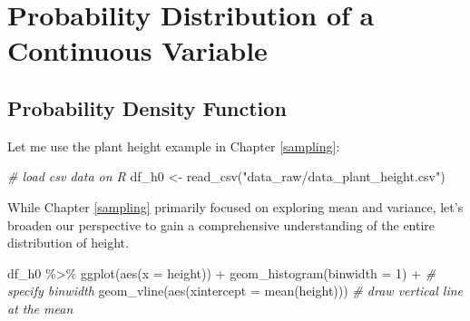 \documentclass[
]{book}
\newenvironment{Shaded}{\begin{snugshade}}{\end{snugshade}}
\newcommand{\AttributeTok}[1]{\textcolor[rgb]{0.77,0.63,0.00}{#1}}
\newcommand{\CommentTok}[1]{\textcolor[rgb]{0.56,0.35,0.01}{\textit{#1}}}
\newcommand{\DecValTok}[1]{\textcolor[rgb]{0.00,0.00,0.81}{#1}}
\newcommand{\FunctionTok}[1]{\textcolor[rgb]{0.00,0.00,0.00}{#1}}
\newcommand{\NormalTok}[1]{#1}
\newcommand{\OtherTok}[1]{\textcolor[rgb]{0.56,0.35,0.01}{#1}}
\newcommand{\SpecialCharTok}[1]{\textcolor[rgb]{0.00,0.00,0.00}{#1}}
\newcommand{\StringTok}[1]{\textcolor[rgb]{0.31,0.60,0.02}{#1}}
\begin{document}
\hypertarget{probability-distribution-of-a-continuous-variable}{%
\section{Probability Distribution of a Continuous Variable}\label{probability-distribution-of-a-continuous-variable}}

\hypertarget{probability-density-function}{%
\subsection{Probability Density Function}\label{probability-density-function}}

Let me use the plant height example in Chapter \ref{sampling}:

\begin{Shaded}
\begin{Highlighting}[]
\CommentTok{\# load csv data on R}
\NormalTok{df\_h0 }\OtherTok{\textless{}{-}} \FunctionTok{read\_csv}\NormalTok{(}\StringTok{"data\_raw/data\_plant\_height.csv"}\NormalTok{)}
\end{Highlighting}
\end{Shaded}

While Chapter \ref{sampling} primarily focused on exploring mean and variance, let's broaden our perspective to gain a comprehensive understanding of the entire distribution of height.

\begin{Shaded}
\begin{Highlighting}[]
\NormalTok{df\_h0 }\SpecialCharTok{\%\textgreater{}\%} 
  \FunctionTok{ggplot}\NormalTok{(}\FunctionTok{aes}\NormalTok{(}\AttributeTok{x =}\NormalTok{ height)) }\SpecialCharTok{+} 
  \FunctionTok{geom\_histogram}\NormalTok{(}\AttributeTok{binwidth =} \DecValTok{1}\NormalTok{) }\SpecialCharTok{+} \CommentTok{\# specify binwidth}
  \FunctionTok{geom\_vline}\NormalTok{(}\FunctionTok{aes}\NormalTok{(}\AttributeTok{xintercept =} \FunctionTok{mean}\NormalTok{(height))) }\CommentTok{\# draw vertical line at the mean}
\end{Highlighting}
\end{Shaded}
\end{document}
